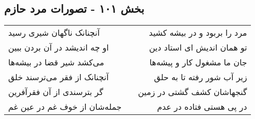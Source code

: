 \begin{center}
\section*{بخش ۱۰۱ - تصورات مرد حازم}
\label{sec:sh101}
\begin{longtable}{l p{0.5cm} r}
آنچنانک ناگهان شیری رسید
&&
مرد را بربود و در بیشه کشید
\\
او چه اندیشد در آن بردن ببین
&&
تو همان اندیش ای استاد دین
\\
می‌کشد شیر قضا در بیشه‌ها
&&
جان ما مشغول کار و پیشه‌ها
\\
آنچنانک از فقر می‌ترسند خلق
&&
زیر آب شور رفته تا به حلق
\\
گر بترسندی از آن فقرآفرین
&&
گنجهاشان کشف گشتی در زمین
\\
جمله‌شان از خوف غم در عین غم
&&
در پی هستی فتاده در عدم
\\
\end{longtable}
\end{center}
